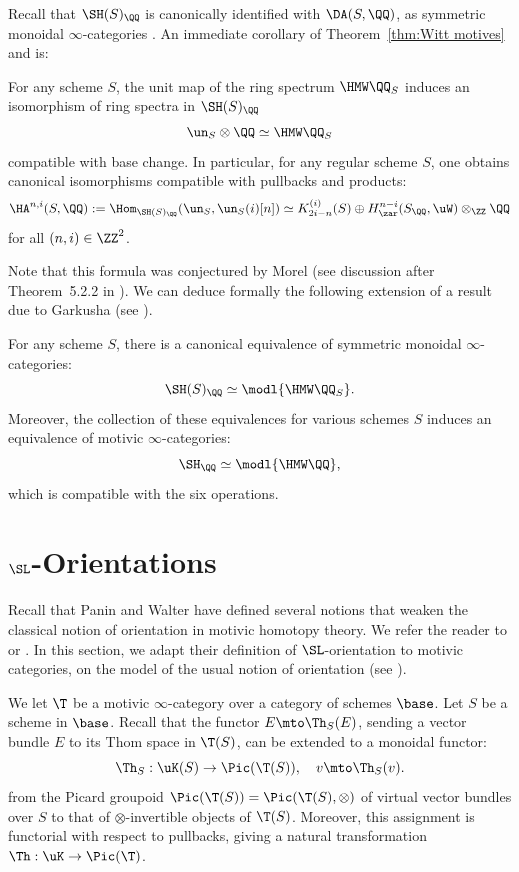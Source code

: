 Recall that $\SH(S)_\QQ$ is canonically identified with $\DA(S,\QQ)$, as symmetric monoidal $\infty$-categories \cite[5.3.35]{CD3}.
An immediate corollary of Theorem~\ref{thm:Witt motives} and \cite[14.2.14]{CD3} is:
\begin{cor}\label{cor:rational_sphere&MW}
For any scheme $S$, the unit map of the ring spectrum $\HMW \QQ_S$ induces an isomorphism of ring spectra in $\SH(S)_\QQ$
\[
\un_S \otimes \QQ \simeq \HMW \QQ_S
\]
compatible with base change.
In particular, for any regular scheme $S$, one obtains canonical isomorphisms
compatible with pullbacks and products:
\[
\HA^{n,i}(S,\QQ):=\Hom_{\SH(S)_\QQ}(\un_S,\un_S(i)[n])
\simeq K_{2i-n}^{(i)}(S) \oplus H^{n-i}_\zar(S_\QQ,\uW) \otimes_\ZZ \QQ
\]
for all $(n,i)\in\ZZ^2$.
\end{cor}
Note that this formula was conjectured by Morel (see discussion after Theorem~5.2.2 in \cite{Morelpi0}).
We can deduce formally the following extension of a result due to Garkusha
(see \cite{Garkusha}).
\begin{cor}\label{cor:rational_SH&DMW}
For any scheme $S$, there is a canonical equivalence of symmetric monoidal $\infty$-categories:
\[
\SH(S)_\QQ \simeq \modl{\HMW \QQ_S}.
\]
Moreover, the collection of these equivalences for various schemes $S$
induces an equivalence of motivic $\infty$-categories:
\[
\SH_\QQ \simeq \modl{\HMW \QQ},
\]
which is compatible with the six operations.
\end{cor}

\section{\texorpdfstring{$\SL$}{SL}-Orientations}
\label{sec:SL}

Recall that Panin and Walter have defined several notions that weaken the classical notion of orientation in motivic homotopy theory. We refer the reader to \cite{AnaSL} or \cite[Def.\,2.1.3]{DF3}.
In this section, we adapt their definition of $\SL$-orientation to motivic categories, on the model of the usual notion of orientation (see \cite[2.4.38, 2.4.40]{CD3}).

\begin{num}
We let $\T$ be a motivic $\infty$-category over a category of schemes $\base$.
Let $S$ be a scheme in $\base$. Recall that the functor $E \mto \Th_S(E)$, sending a vector bundle $E$ to its Thom space in $\T(S)$, can be extended to a monoidal functor:
\[
\Th_S:\uK(S) \to \Pic(\T(S)),
\quad
v \mto \Th_S(v).
\]
from the Picard groupoid $\Pic(\T(S)) = \Pic(\T(S),\otimes)$ of virtual vector bundles over $S$ \cite{Del}
to that of $\otimes$-invertible objects of $\T(S)$.
Moreover, this assignment is functorial with respect to pullbacks,
giving a natural transformation $\Th:\uK \to \Pic(\T)$.
\end{num}

